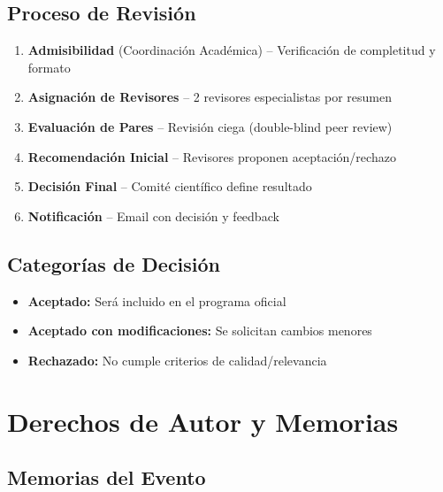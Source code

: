 \documentclass[12pt,a4paper]{article}
\begin{document}
\subsection{Proceso de Revisión}

\begin{enumerate}[label={\textcolor{verdemid}{\textbf{Etapa \arabic{*}:}}}]
  \item \textbf{Admisibilidad} (Coordinación Académica) -- Verificación de completitud y formato
  \item \textbf{Asignación de Revisores} -- 2 revisores especialistas por resumen
  \item \textbf{Evaluación de Pares} -- Revisión ciega (double-blind peer review)
  \item \textbf{Recomendación Inicial} -- Revisores proponen aceptación/rechazo
  \item \textbf{Decisión Final} -- Comité científico define resultado
  \item \textbf{Notificación} -- Email con decisión y feedback
\end{enumerate}

\subsection{Categorías de Decisión}

\begin{tcolorbox}[cajainfo, title=Posibles resultados]
\begin{itemize}[label={\textcolor{verdemid}{\textbullet}}]
  \item \textbf{Aceptado:} Será incluido en el programa oficial
  \item \textbf{Aceptado con modificaciones:} Se solicitan cambios menores
  \item \textbf{Rechazado:} No cumple criterios de calidad/relevancia
\end{itemize}
\end{tcolorbox}

\section{Derechos de Autor y Memorias}

\subsection{Memorias del Evento}
\end{document}
